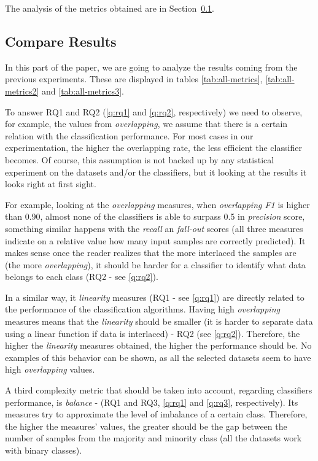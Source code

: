 The analysis of the metrics obtained are in Section~\ref{sec:compresults}.

\subsection{Compare Results}\label{sec:compresults}

In this part of the paper, we are going to analyze the results coming from the
previous experiments. These are displayed in tables \ref{tab:all-metrics}, 
\ref{tab:all-metrics2} and \ref{tab:all-metrics3}. 

To answer RQ1 and RQ2 (\ref{q:rq1} and \ref{q:rq2}, respectively) we need to 
observe, for example, the values from \textit{overlapping}, we assume that 
there is a certain relation with the classification performance. For most cases 
in our experimentation, the higher the overlapping rate, the less efficient the 
classifier becomes. Of course, this assumption is not backed up by any 
statistical experiment on the datasets and/or the classifiers, but it looking 
at the results it looks right at first sight.

For example, looking at the \textit{overlapping} measures, when 
\textit{overlapping F1} is higher than 0.90, almost none of the classifiers is 
able to surpass 0.5 in \textit{precision} score, something similar happens with 
the \textit{recall} an \textit{fall-out} scores (all three measures indicate on 
a relative value how many input samples are correctly predicted). It makes 
sense once the reader realizes that the more interlaced the samples are (the 
more \textit{overlapping}), it should be harder for a classifier to identify 
what data belongs to each class (RQ2 - see \ref{q:rq2}).

In a similar way, it \textit{linearity} measures (RQ1 - see \ref{q:rq1}) are 
directly related to the performance of the classification algorithms. Having 
high \textit{overlapping} measures means that the \textit{linearity} should be 
smaller (it is harder to separate data using a linear function if data is 
interlaced) - RQ2 (see \ref{q:rq2}). Therefore, the higher the 
\textit{linearity} measures obtained, the higher the performance should be. No 
examples of this behavior can be shown, as all the selected datasets seem to 
have high \textit{overlapping} values.

A third complexity metric that should be taken into account, regarding 
classifiers performance, is \textit{balance} - (RQ1 and RQ3, \ref{q:rq1} and
\ref{q:rq3}, respectively). Its measures try to approximate the level of 
imbalance of a certain class. Therefore, the higher the measures' values, the 
greater should be the gap between the number of samples from the majority and 
minority class (all the datasets work with binary classes).


